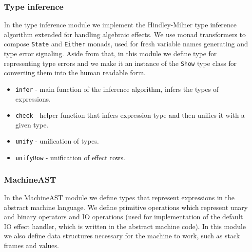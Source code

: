 \documentclass[a4paper]{article}
\begin{document}
\subsubsection*{Type inference}
In the type inference module we implement the Hindley-Milner type inference algorithm extended
for handling algebraic effects. We use monad transformers to compose \verb+State+ and \verb+Either+
monads, used for fresh variable names generating and type error signaling. Aside from that, in this
module we define type for representing type errors and we make it an instance of the \verb+Show+
type class for converting them into the human readable form.

\begin{itemize}
  \item \verb+infer+ - main function of the inference algorithm, infers the types of expressions.
  \item \verb+check+ - helper function that infers expression type and then unifies it with a given type.
  \item \verb+unify+ - unification of types.
  \item \verb+unifyRow+ - unification of effect rows.
\end{itemize}

\subsubsection*{MachineAST}
In the MachineAST module we define types that represent expressions in the abstract machine language.
We define primitive operations which represent unary and binary operators and IO operations
(used for implementation of the default IO effect handler, which is written in the abstract machine code).
In this module we also define data structures necessary for the machine to work, such as stack frames and values.
\end{document}
